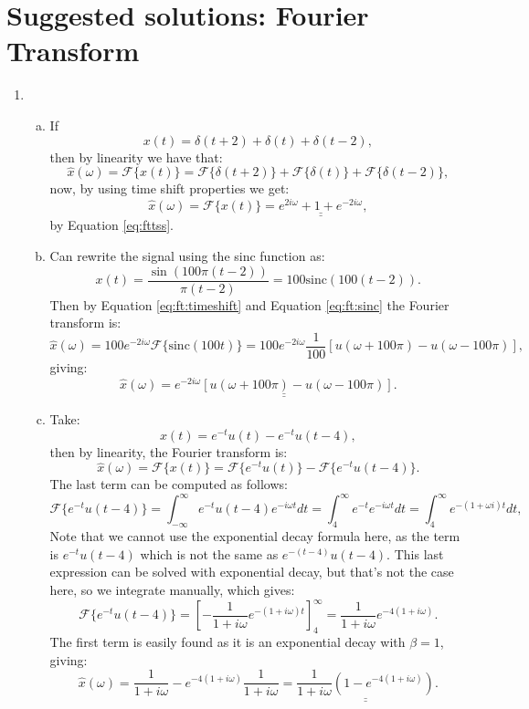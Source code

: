 
\newpage
\section{Suggested solutions: Fourier Transform}
\begin{enumerate}

  \item
        \begin{enumerate}[a)]
          \item If
                \[ x(t) = \delta(t+2) + \delta(t) + \delta(t-2), \]
                then by linearity we have that:
                \[ \hat{x}(\omega) = \mathcal{F}\{x(t)\} = \mathcal{F}\{\delta(t+2)\}+\mathcal{F}\{\delta(t)\}+\mathcal{F}\{\delta(t-2)\}, \]
                now, by using time shift properties we get:
                \[ \hat{x}(\omega) = \mathcal{F}\{x(t)\} = \underline{\underline{e^{2i\omega}+1+e^{-2i\omega}}}, \]
                by Equation \ref{eq:fttss}.

          \item Can rewrite the signal using the sinc function as:
                \[ x(t) = \frac{\sin(100\pi(t-2))}{\pi(t-2)} = 100\text{sinc}(100(t-2)). \]
                Then by Equation \ref{eq:ft:timeshift} and Equation \ref{eq:ft:sinc} the Fourier transform is:
                \[ \hat{x}(\omega) = 100e^{-2i\omega}\mathcal{F}\{\text{sinc}(100t)\} = 100e^{-2i\omega} \frac{1}{100}[u(\omega+100\pi)-u(\omega-100\pi)], \]
                giving:
                \[ \hat{x}(\omega) = \underline{\underline{e^{-2i\omega}[u(\omega+100\pi)-u(\omega-100\pi)]}}. \]

          \item Take:
                \[ x(t) = e^{-t}u(t)-e^{-t}u(t-4), \]
                then by linearity, the Fourier transform is:
                \[ \hat{x}(\omega) = \mathcal{F}\{x(t)\} = \mathcal{F}\{e^{-t}u(t)\}-\mathcal{F}\{e^{-t}u(t-4)\}. \]
                The last term can be computed as follows:
                \[ \mathcal{F}\{e^{-t}u(t-4)\} = \int_{-\infty}^{\infty}e^{-t}u(t-4)e^{-i\omega t}dt=\int_{4}^{\infty}e^{-t}e^{-i\omega t}dt=\int_{4}^{\infty}e^{-(1+\omega i)t}dt, \]
                Note that we cannot use the exponential decay formula here, as the term is $e^{-t}u(t-4)$ which is not the same as $e^{-(t-4)}u(t-4)$.
                This last expression can be solved with exponential decay, but that's not the case here, so we integrate manually, which gives:
                \[ \mathcal{F}\{e^{-t}u(t-4)\} = \left[-\frac{1}{1+i\omega}e^{-(1+i\omega)t}\right]_{4}^{\infty}=\frac{1}{1+i\omega}e^{-4(1+i\omega)}. \]
                The first term is easily found as it is an exponential decay with $\beta=1$, giving:
                \[ \hat{x}(\omega)=\frac{1}{1+i\omega}-e^{-4(1+i\omega)}\frac{1}{1+i\omega}=\underline{\underline{\frac{1}{1+i\omega}\left(1-e^{-4(1+i\omega)}\right)}}. \]
        \end{enumerate}


\end{enumerate}

